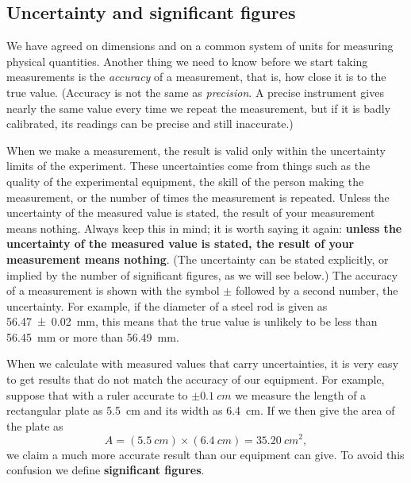 \documentclass[11pt,a4paper]{article}
\begin{document}
\subsection{Uncertainty and significant figures}

We have agreed on dimensions and on a common system of units for measuring physical quantities.
Another thing we need to know before we start taking measurements is the \emph{accuracy} of a
measurement, that is, how close it is to the true value. (Accuracy is not the same as
\emph{precision}. A precise instrument gives nearly the same value every time we repeat the
measurement, but if it is badly calibrated, its readings can be precise and still inaccurate.)

When we make a measurement, the result is valid only within the uncertainty limits of the
experiment. These uncertainties come from things such as the quality of the experimental equipment,
the skill of the person making the measurement, or the number of times the measurement is repeated.
Unless the uncertainty of the measured value is stated, the result of your measurement means
nothing. Always keep this in mind; it is worth saying it again: \textbf{unless the uncertainty of
the measured value is stated, the result of your measurement means nothing}. (The uncertainty can
be stated explicitly, or implied by the number of significant figures, as we will see below.) The
accuracy of a measurement is shown with the symbol $\pm$ followed by a second number, the
uncertainty. For example, if the diameter of a steel rod is given as \qty{56.47 \pm 0.02}{mm}, this
means that the true value is unlikely to be less than \qty{56.45}{mm} or more than \qty{56.49}{mm}.

When we calculate with measured values that carry uncertainties, it is very easy to get results
that do not match the accuracy of our equipment. For example, suppose that with a ruler accurate to
$\pm\qty{0.1}{cm}$ we measure the length of a rectangular plate as \qty{5.5}{cm} and its width as
\qty{6.4}{cm}. If we then give the area of the plate as
\begin{equation}\label{eq:plate}
  A = (\qty{5.5}{cm}) \times (\qty{6.4}{cm}) = \qty{35.20}{cm^2} ,
\end{equation}
we claim a much more accurate result than our equipment can give. To avoid this confusion we
define \textbf{significant figures}.
\end{document}
